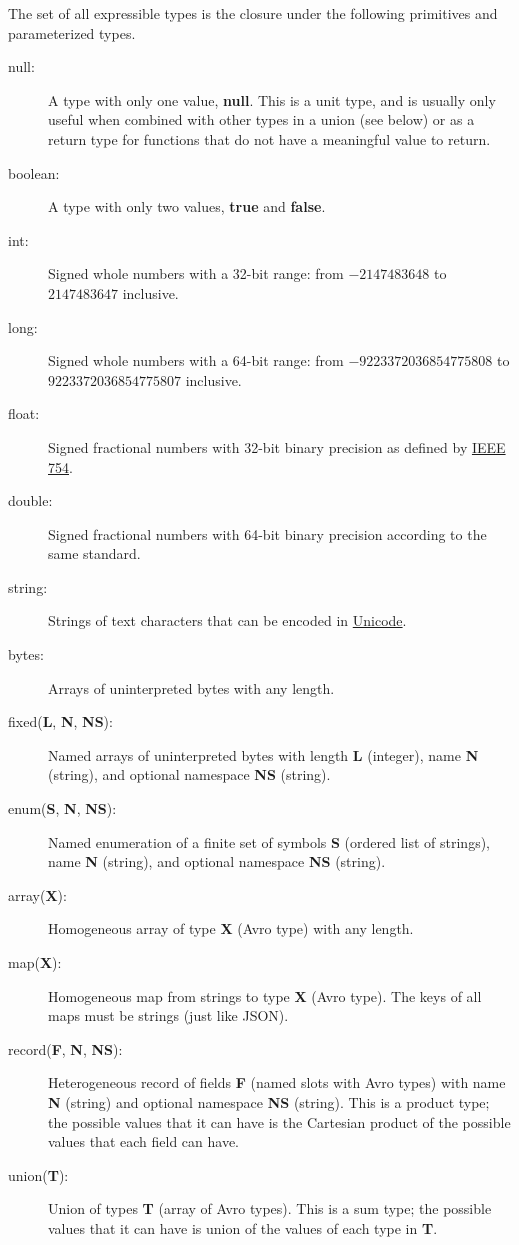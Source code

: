 \documentclass{article}
\newcommand{\PFAc}{\ttfamily\bfseries}
\newcommand{\PFAtp}{\ttfamily\bfseries}
\newenvironment{allowedfields}%
  {\begin{center} \begin{minipage}{0.9\linewidth} \begin{description}}%
  {\end{description} \end{minipage} \end{center}}
\theoremstyle{definition}
\begin{document}
The set of all expressible types is the closure under the following primitives and parameterized types.
\begin{allowedfields}
\item[null:] A type with only one value, {\PFAc null}.  This is a unit type, and is usually only useful when combined with other types in a union (see below) or as a return type for functions that do not have a meaningful value to return.
\item[boolean:] A type with only two values, {\PFAc true} and {\PFAc false}.
\item[int:] Signed whole numbers with a 32-bit range: from $-2147483648$ to $2147483647$ inclusive.
\item[long:] Signed whole numbers with a 64-bit range: from $-9223372036854775808$ to $9223372036854775807$ inclusive.
\item[float:] Signed fractional numbers with 32-bit binary precision as defined by \href{http://dx.doi.org/10.1109%2FIEEESTD.2008.4610935}{IEEE 754}.
\item[double:] Signed fractional numbers with 64-bit binary precision according to the same standard.
\item[string:] Strings of text characters that can be encoded in \href{http://www.unicode.org/standard/standard.html}{Unicode}.
\item[bytes:] Arrays of uninterpreted bytes with any length.
\item[fixed({\PFAtp L}, {\PFAtp N}, {\PFAtp NS}):] Named arrays of uninterpreted bytes with length {\PFAtp L} (integer), name {\PFAtp N} (string), and optional namespace {\PFAtp NS} (string).
\item[enum({\PFAtp S}, {\PFAtp N}, {\PFAtp NS}):] Named enumeration of a finite set of symbols {\PFAtp S} (ordered list of strings), name {\PFAtp N} (string), and optional namespace {\PFAtp NS} (string).
\item[array({\PFAtp X}):] Homogeneous array of type {\PFAtp X} (Avro type) with any length.
\item[map({\PFAtp X}):] Homogeneous map from strings to type {\PFAtp X} (Avro type).  The keys of all maps must be strings (just like JSON).
\item[record({\PFAtp F}, {\PFAtp N}, {\PFAtp NS}):] Heterogeneous record of fields {\PFAtp F} (named slots with Avro types) with name {\PFAtp N} (string) and optional namespace {\PFAtp NS} (string).  This is a product type; the possible values that it can have is the Cartesian product of the possible values that each field can have.
\end{allowedfields}
\begin{allowedfields}
\item[union({\PFAtp T}):] Union of types {\PFAtp T} (array of Avro types).  This is a sum type; the possible values that it can have is union of the values of each type in {\PFAtp T}.
\end{allowedfields}
\end{document}

